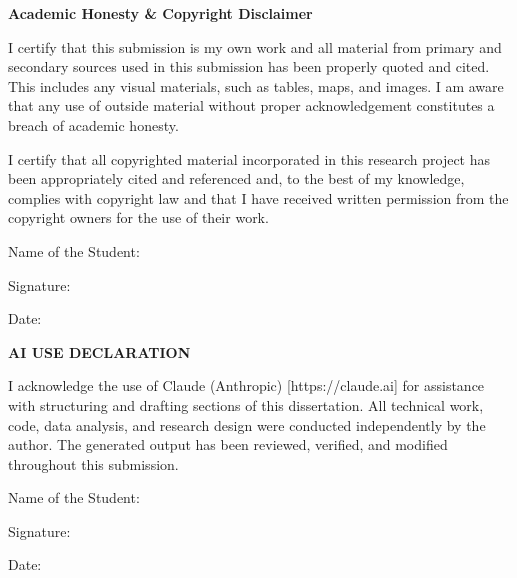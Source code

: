 \noindent\textbf{Academic Honesty \& Copyright Disclaimer}

\vspace{1em}

I certify that this submission is my own work and all material from primary and secondary sources used in this submission has been properly quoted and cited. This includes any visual materials, such as tables, maps, and images. I am aware that any use of outside material without proper acknowledgement constitutes a breach of academic honesty.

\vspace{1em}

I certify that all copyrighted material incorporated in this research project has been appropriately cited and referenced and, to the best of my knowledge, complies with copyright law and that I have received written permission from the copyright owners for the use of their work.

\vspace{2em}

\noindent Name of the Student: \hrulefill

\noindent Signature: \hrulefill

\noindent Date: \hrulefill

\vspace{3em}

\begin{center}
\textbf{AI USE DECLARATION}
\end{center}

\vspace{1em}

I acknowledge the use of Claude (Anthropic) [https://claude.ai] for assistance with structuring and drafting sections of this dissertation. All technical work, code, data analysis, and research design were conducted independently by the author. The generated output has been reviewed, verified, and modified throughout this submission.

\vspace{2em}

\noindent Name of the Student: \hrulefill

\noindent Signature: \hrulefill

\noindent Date: \hrulefill
